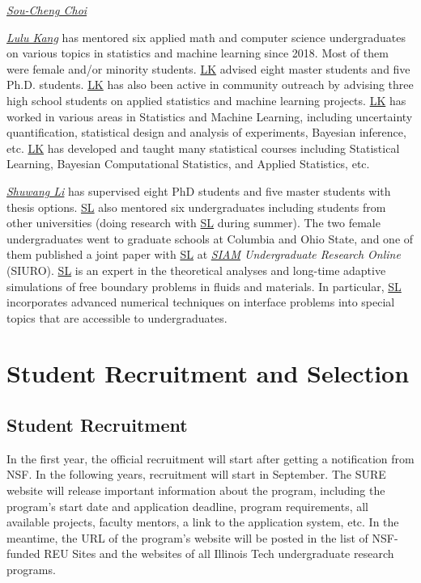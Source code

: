 \documentclass[11pt]{NSFamsart}
\newcommand{\LK}{\hyperlink{LKlink}{LK}\xspace}
\newcommand{\SL}{\hyperlink{SLlink}{SL}\xspace}
\newcommand{\SIAM}{\hyperlink{SIAMlink}{SIAM}\xspace}
\begin{document}
\noindent\underline{\textit{Sou-Cheng Choi}} 

\noindent \underline{\textit{Lulu Kang}} has mentored six applied math and computer science undergraduates on various topics in statistics and machine learning since 2018. Most of them were female and/or minority students. \LK advised eight master students and five Ph.D. students. \LK has also been active in community outreach by advising three high school students on applied statistics and machine learning projects. 
\LK has worked in various areas in Statistics and Machine Learning, including uncertainty quantification, statistical design and analysis of experiments, Bayesian inference, etc. 
\LK has developed and taught many statistical courses including Statistical Learning, Bayesian Computational Statistics, and Applied Statistics, etc. 

\noindent \underline{\textit{Shuwang Li}} has supervised eight PhD students and five master  students with thesis options. \SL also mentored six undergraduates including students from other universities (doing research with \SL during summer). The two female undergraduates went to graduate schools at Columbia and Ohio State,  and one of them published a joint paper with \SL at {\it \SIAM Undergraduate Research Online} (SIURO). 
\SL is an expert in the theoretical analyses and
long-time adaptive simulations of free boundary problems in  fluids and
materials. In particular,  \SL incorporates advanced numerical techniques on interface problems into special topics that are accessible to undergraduates. 

 


\section{Student Recruitment and Selection}

\subsection{Student Recruitment} 



 In the first year, the official recruitment will start after getting a notification from NSF.
 In the following years,  recruitment will start in September. The SURE website
 \cite{SUREWeb} will release important information about the program, including the program's start date and application deadline, program requirements,  all available projects, faculty mentors, a link to the application system, etc. In the meantime, the URL of the program’s
website \cite{SUREWeb} will be posted in the list of NSF-funded REU Sites and the websites of all Illinois Tech undergraduate research programs.
\end{document}
